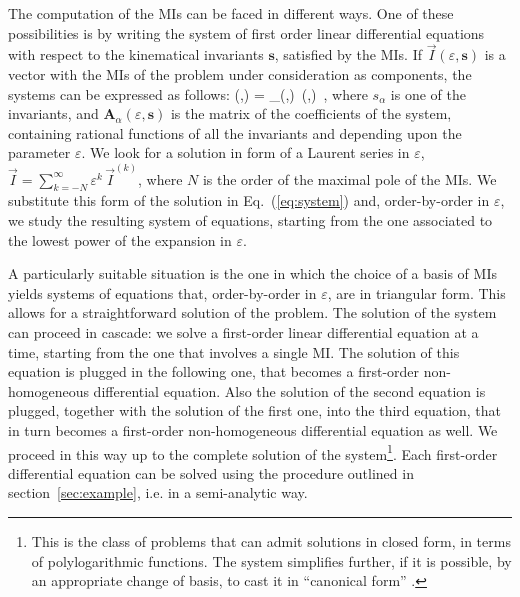 \documentclass[final,1p,times]{elsarticle}
\begin{document}
The computation of the MIs can be faced in different ways. One of these possibilities is by writing the system of first order linear differential equations with respect to the kinematical invariants $\mathbf{s}$, satisfied by the MIs. If $\vec{I}(\varepsilon,\mathbf{s})$ is a vector with the MIs of the problem under consideration as components, the systems can be expressed as follows:
\be
\label{eq:system}
 (\varepsilon,)
= _\alpha(\varepsilon,)\, (\varepsilon,)\, ,
\ee
where $s_\alpha$ is one of the invariants, 
and $\mathbf{A}_\alpha(\varepsilon,\mathbf{s})$ is the matrix of the coefficients of the system, containing rational functions of all the invariants and depending upon the parameter $\varepsilon$. We look for a solution in form of a Laurent series in $\varepsilon$, $\vec{I}=\sum_{k=-N}^{\infty} \varepsilon^k \, \vec{I}^{(k)}$, where $N$ is the order of the maximal pole of the MIs. We substitute this form of the solution in Eq.~(\ref{eq:system}) and, order-by-order in $\varepsilon$, we study the resulting system of equations, starting from the one associated to the lowest power of the expansion in $\varepsilon$.

A particularly suitable situation is the one in which the choice of a basis of MIs yields systems of equations that, order-by-order in $\varepsilon$, are in triangular form. This allows for a straightforward solution of the problem. The solution of the system can proceed in cascade: we solve a first-order linear differential equation at a time, starting from the one that involves a single MI. The solution of this equation is plugged in the following one, that becomes a first-order non-homogeneous differential equation. Also the solution of the second equation is plugged, together with the solution of the first one, into the third equation, that in turn becomes a first-order non-homogeneous differential equation as well. We proceed in this way up to the complete solution of the system\footnote{This is the class of problems that can admit solutions in closed form, in terms of polylogarithmic functions.
The system simplifies further, if it is possible, by an appropriate change of basis, to cast it in ``canonical form'' \cite{Henn:2014qga}.}.  
Each first-order differential equation can be solved using the procedure outlined in section~\ref{sec:example}, i.e. in a semi-analytic way.
\end{document}
